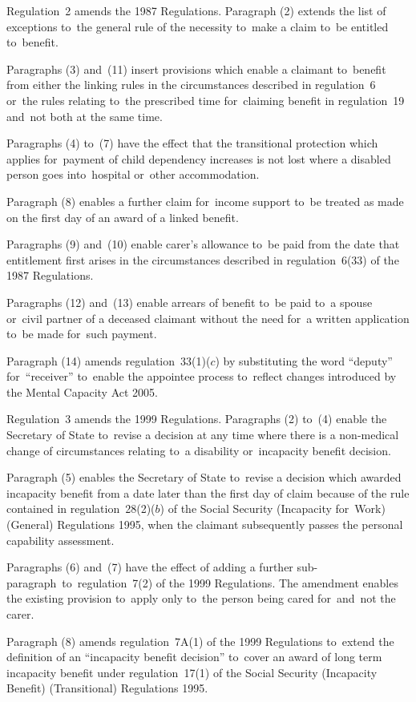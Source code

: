 \documentclass[12pt,a4paper]{article}
\begin{document}
Regulation~2 amends the 1987 Regulations. Paragraph (2) extends the list of exceptions to~the general rule of the necessity to~make a claim to~be entitled to~benefit.

Paragraphs (3) and~(11) insert provisions which enable a claimant to~benefit from either the linking rules in the circumstances described in regulation~6 or~the rules relating to~the prescribed time for~claiming benefit in regulation~19 and~not both at the same time.

Paragraphs (4) to~(7) have the effect that the transitional protection which applies for~payment of child dependency increases is not lost where a disabled person goes into~hospital or~other accommodation.

Paragraph (8) enables a further claim for~income support to~be treated as made on the first day of an award of a linked benefit.

Paragraphs (9) and~(10) enable carer’s allowance to~be paid from the date that entitlement first arises in the circumstances described in regulation~6(33) of the 1987 Regulations.

Paragraphs (12) and~(13) enable arrears of benefit to~be paid to~a spouse or~civil partner of a deceased claimant without the need for~a written application to~be made for~such payment.

Paragraph (14) amends regulation~33(1)($c$)  by substituting the word “deputy” for~“receiver” to~enable the appointee process to~reflect changes introduced by the Mental Capacity Act 2005.

Regulation~3 amends the 1999 Regulations. Paragraphs (2) to~(4) enable the Secretary of State to~revise a decision at any time where there is a non-medical change of circumstances relating to~a disability or~incapacity benefit decision.

Paragraph (5) enables the Secretary of State to~revise a decision which awarded incapacity benefit from a date later than the first day of claim because of the rule contained in regulation~28(2)($b$)  of the Social Security (Incapacity for~Work) (General) Regulations 1995, when the claimant subsequently passes the personal capability assessment.

Paragraphs (6) and~(7) have the effect of adding a further sub-paragraph~to~regulation~7(2) of the 1999 Regulations. The amendment enables the existing provision to~apply only to~the person being cared for~and~not the carer.

Paragraph (8) amends regulation~7A(1) of the 1999 Regulations to~extend the definition of an “incapacity benefit decision” to~cover an award of long term incapacity benefit under regulation~17(1) of the Social Security (Incapacity Benefit) (Transitional) Regulations 1995.
\end{document}
